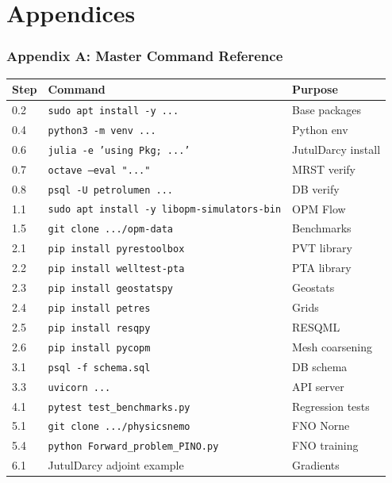 \documentclass[10pt,a4paper]{article}
\newcommand{\cmd}[1]{\texttt{#1}}
\begin{document}
\part{Appendices}

\section{Appendix A: Master Command Reference}

\begin{longtable}{@{}p{2.4cm}p{4.2cm}p{6cm}@{}}
\toprule
Step & Command & Purpose\\
\midrule
\endhead
0.2 & \cmd{sudo apt install -y ...} & Base packages\\
0.4 & \cmd{python3 -m venv ...} & Python env\\
0.6 & \cmd{julia -e 'using Pkg; ...'} & JutulDarcy install\\
0.7 & \cmd{octave --eval "..."} & MRST verify\\
0.8 & \cmd{psql -U petrolumen ...} & DB verify\\
1.1 & \cmd{sudo apt install -y libopm-simulators-bin} & OPM Flow\\
1.5 & \cmd{git clone .../opm-data} & Benchmarks\\
2.1 & \cmd{pip install pyrestoolbox} & PVT library\\
2.2 & \cmd{pip install welltest-pta} & PTA library\\
2.3 & \cmd{pip install geostatspy} & Geostats\\
2.4 & \cmd{pip install petres} & Grids\\
2.5 & \cmd{pip install resqpy} & RESQML\\
2.6 & \cmd{pip install pycopm} & Mesh coarsening\\
3.1 & \cmd{psql -f schema.sql} & DB schema\\
3.3 & \cmd{uvicorn ...} & API server\\
4.1 & \cmd{pytest test_benchmarks.py} & Regression tests\\
5.1 & \cmd{git clone .../physicsnemo} & FNO Norne\\
5.4 & \cmd{python Forward_problem_PINO.py} & FNO training\\
6.1 & JutulDarcy adjoint example & Gradients\\

\end{longtable}
\end{document}
